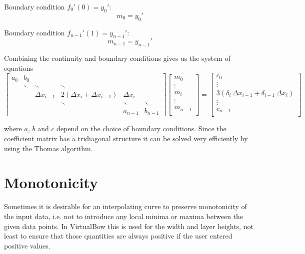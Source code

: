 Boundary condition $f_{0}'(0) = y_{0}'$:
%
\begin{equation}
m_{0} = y_{0}'
\end{equation}

Boundary condition $f_{n-1}'(1) = y_{n-1}'$:
%
\begin{equation}
m_{n-1} = y_{n-1}'
\end{equation}

Combining the continuity and boundary conditions gives us the system of equations
%
\begin{equation}
\begin{bmatrix}
a_{0} & b_{0} \\
& \ddots & \ddots & \ddots \\
&& \Delta x_{i-1} & 2(\Delta x_{i} + \Delta x_{i-1}) & \Delta x_{i} \\
&&& \ddots & \ddots & \ddots \\
&&&& a_{n-1} & b_{n-1}
\end{bmatrix}
\begin{bmatrix}
m_{0} \\
\vdots \\
m_{i} \\
\vdots \\
m_{n-1} \\
\end{bmatrix}
=
\begin{bmatrix}
c_{0} \\
\vdots \\
3\left(\delta_{i}\,\Delta x_{i-1} + \delta_{i-1}\,\Delta x_{i}\right) \\
\vdots \\
c_{n-1} \\
\end{bmatrix}
\end{equation}

where $a$, $b$ and $c$ depend on the choice of boundary conditions. Since the coefficient matrix has a tridiagonal structure it can be solved very efficiently by using the Thomas algorithm.

\section{Monotonicity}

Sometimes it is desirable for an interpolating curve to preserve monotonicity of the input data, i.e. not to introduce any local minima or maxima between the given data points.
In VirtualBow this is used for the width and layer heights, not least to ensure that those quantities are always positive if the user entered positive values.

